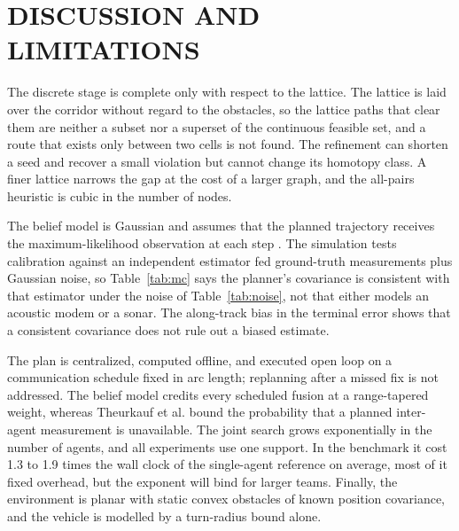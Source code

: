 \documentclass[letterpaper, 10 pt, conference]{ieeeconf}
\theoremstyle{remark}
\begin{document}
\section{DISCUSSION AND LIMITATIONS}
The discrete stage is complete only with respect to the lattice. The lattice
is laid over the corridor without regard to the obstacles, so the lattice
paths that clear them are neither a subset nor a superset of the continuous
feasible set, and a route that exists only between two cells is not found.
The refinement can shorten a seed and recover a small violation but cannot
change its homotopy class. A finer lattice narrows the gap at the cost of a
larger graph, and the all-pairs heuristic is cubic in the number of nodes.

The belief model is Gaussian and assumes that the planned trajectory
receives the maximum-likelihood observation at each step
\cite{platt2010belief}. The simulation
tests calibration against an independent estimator fed ground-truth
measurements plus Gaussian noise, so Table~\ref{tab:mc} says the planner's
covariance is consistent with that estimator under the noise of
Table~\ref{tab:noise}, not that either models an acoustic modem or a sonar. The along-track bias in the terminal error shows that a consistent
covariance does not rule out a biased estimate.

The plan is centralized, computed offline, and executed open loop on a
communication schedule fixed in arc length; replanning after a missed fix is
not addressed. The belief model credits every scheduled fusion at a
range-tapered weight, whereas Theurkauf et al. \cite{theurkauf2025coop}
bound the probability that a planned inter-agent measurement is
unavailable. The joint search grows exponentially in the
number of agents, and all experiments use one support. In the benchmark it
cost 1.3 to 1.9 times the wall clock of the single-agent reference on
average, most of it fixed overhead, but the exponent will bind for larger
teams. Finally, the environment is planar with static convex obstacles of
known position covariance, and the vehicle is modelled by a turn-radius
bound alone.

\end{document}
